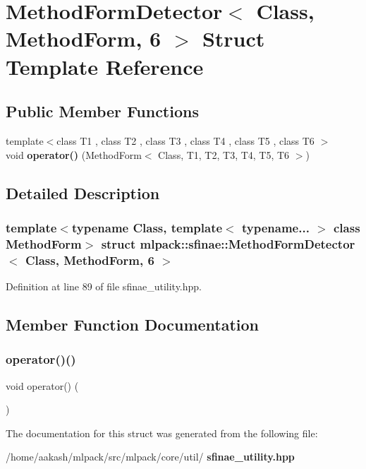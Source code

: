 \section{Method\+Form\+Detector$<$ Class, Method\+Form, 6 $>$ Struct Template Reference}
\label{structmlpack_1_1sfinae_1_1MethodFormDetector_3_01Class_00_01MethodForm_00_016_01_4}
\subsection*{Public Member Functions}
\begin{DoxyCompactItemize}
\item 
{\footnotesize template$<$class T1 , class T2 , class T3 , class T4 , class T5 , class T6 $>$ }\\void \textbf{ operator()} (Method\+Form$<$ Class, T1, T2, T3, T4, T5, T6 $>$)
\end{DoxyCompactItemize}


\subsection{Detailed Description}
\subsubsection*{template$<$typename Class, template$<$ typename... $>$ class Method\+Form$>$\newline
struct mlpack\+::sfinae\+::\+Method\+Form\+Detector$<$ Class, Method\+Form, 6 $>$}



Definition at line 89 of file sfinae\+\_\+utility.\+hpp.



\subsection{Member Function Documentation}
\mbox{\label{structmlpack_1_1sfinae_1_1MethodFormDetector_3_01Class_00_01MethodForm_00_016_01_4_ab546bda240a357188410a8e719a28ce6}} 
\subsubsection{operator()()}
{\footnotesize\ttfamily void operator() (\begin{DoxyParamCaption}\item[{Method\+Form$<$ Class, T1, T2, T3, T4, T5, T6 $>$}]{ }\end{DoxyParamCaption})}



The documentation for this struct was generated from the following file\+:\begin{DoxyCompactItemize}
\item 
/home/aakash/mlpack/src/mlpack/core/util/\textbf{ sfinae\+\_\+utility.\+hpp}\end{DoxyCompactItemize}

